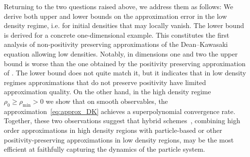 \documentclass[a4paper,12pt]{article}
\begin{document}
Returning to the two questions raised above, we address them as follows: We derive both upper and lower bounds on the approximation error in the low density regime, i.e. for initial densities that may locally vanish. The lower bound is derived for a concrete one-dimensional example. This constitutes the first analysis of non-positivity preserving approximations of the Dean--Kawasaki equation allowing low densities. Notably, in dimensions one and two the upper bound is worse than the one obtained by the positivity preserving approximation of \cite{Djurdjevac2024}. The lower bound does not quite match it, but it indicates that in low density regimes approximations that do not preserve positivity have limited approximation quality. On the other hand, in the high density regime $\rho_0 \ge \rho_{\min} > 0$ we show that on smooth observables, the approximation~\eqref{eq:approx_DK} achieves a superpolynomial convergence rate. Together, these two observations suggest that hybrid schemes~\cite{Djurdjevac2025Hybrid}, combining high order approximations in high density regions with particle-based or other positivity-preserving approximations in low density regions, may be the most efficient at faithfully capturing the dynamics of the particle system.
\end{document}
